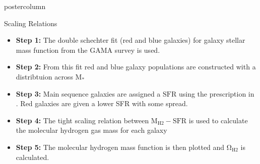 \documentclass{beamer}
\begin{document}
\begin{frame}
\begin{columns}
\begin{column}{.5\textwidth}
\begin{beamercolorbox}[center,wd=\textwidth]{postercolumn}
\begin{minipage}[T]{.95\textwidth}
{\begin{myblock}{\LARGE Scaling Relations}
						\begin{itemize}
							\item \textbf{Step 1:} The double schechter fit (red and blue galaxies) for galaxy stellar mass function from the GAMA survey \citep{baldry2012galaxy} is used.
							\item \textbf{Step 2:} From this fit red and blue galaxy populations are constructed with a distribtuion across $\mathrm{M_{*}}$
							\item \textbf{Step 3:} Main sequence galaxies are assigned a $\mathrm{SFR}$ using the prescription in \cite{saintonge2016SFRMstar}. Red galaxies are given a lower SFR with some spread.
							\item \textbf{Step 4:} The tight scaling relation between $\mathrm{M_{H2}-SFR}$ is used to calculate the molecular hydrogen gas mass for each galaxy
							\item \textbf{Step 5:} The molecular hydrogen mass function is then plotted and  $\mathrm{\Omega_{H2}}$ is calculated.
						\end{itemize}

\end{myblock}}
\end{minipage}
\end{beamercolorbox}
\end{column}
\end{columns}
\end{frame}
\end{document}
